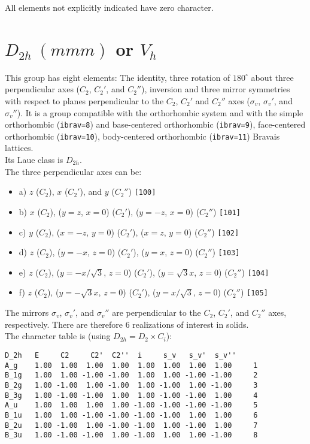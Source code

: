 \documentclass[12pt,a4paper,twoside]{report}
\begin{document}
All elements not explicitly indicated have zero character.

\newpage
{\color{coral}\section{$D_{2h}\ (mmm)$ or $V_h$}}  
\color{black}
This group has eight elements: The identity, three rotation of $180^\circ$
about three perpendicular axes ($C_2$, $C_2'$, and $C_2''$),
inversion and three mirror symmetries with respect to planes perpendicular to
the $C_2$, $C_2'$ and $C_2''$ axes ($\sigma_v$, $\sigma_v'$, and $\sigma_v''$).
It is a group compatible with the orthorhombic system and with the
simple orthorhombic (\texttt{ibrav=8}) and base-centered 
orthorhombic (\texttt{ibrav=9}), face-centered orthorhombic (\texttt{ibrav=10}),
body-centered orthorhombic (\texttt{ibrav=11}) Bravais lattices. \\
Its Laue class is $D_{2h}$. \\
The three perpendicular axes can be:
\begin{itemize}
\item
a) $z$ ($C_2$), $x$ ($C_2'$), and $y$ ($C_2''$) \texttt{[100]}
\item
b) $x$ ($C_2$), ($y=z$, $x=0$) ($C_2'$), ($y=-z$, $x=0$) ($C_2''$) 
\texttt{[101]}
\item
c) $y$ ($C_2$), ($x=-z$, $y=0$) ($C_2'$), ($x=z$, $y=0$) ($C_2''$) 
\texttt{[102]}
\item
d) $z$ ($C_2$), ($y=-x$, $z=0$) ($C_2'$), ($y=x$, $z=0$) ($C_2''$) 
\texttt{[103]}
\item
e) $z$ ($C_2$), ($y=-x/\sqrt{3}$, $z=0$) ($C_2'$), ($y=\sqrt{3}x$, $z=0$) 
($C_2''$) \texttt{[104]}
\item
f) $z$ ($C_2$), ($y=-\sqrt{3}x$, $z=0$) ($C_2'$), ($y=x/\sqrt{3}$, $z=0$) 
($C_2''$) \texttt{[105]}
\end{itemize}
The mirrors $\sigma_v$, $\sigma_v'$, and $\sigma_v''$  are perpendicular to 
the $C_2$, $C_2'$, and $C_2''$ axes, respectively.
There are therefore $6$ realizations of interest in solids. \\
The character table is (using $D_{2h}=D_2 \times C_i$):
\begin{tcolorbox}
\begin{footnotesize}
\begin{verbatim}
D_2h   E     C2     C2'  C2''  i     s_v   s_v'  s_v''
A_g    1.00  1.00  1.00  1.00  1.00  1.00  1.00  1.00     1 
B_1g   1.00  1.00 -1.00 -1.00  1.00  1.00 -1.00 -1.00     2
B_2g   1.00 -1.00  1.00 -1.00  1.00 -1.00  1.00 -1.00     3
B_3g   1.00 -1.00 -1.00  1.00  1.00 -1.00 -1.00  1.00     4
A_u    1.00  1.00  1.00  1.00 -1.00 -1.00 -1.00 -1.00     5
B_1u   1.00  1.00 -1.00 -1.00 -1.00 -1.00  1.00  1.00     6
B_2u   1.00 -1.00  1.00 -1.00 -1.00  1.00 -1.00  1.00     7
B_3u   1.00 -1.00 -1.00  1.00 -1.00  1.00  1.00 -1.00     8
\end{verbatim}
\end{footnotesize}
\end{tcolorbox}
\end{document}
